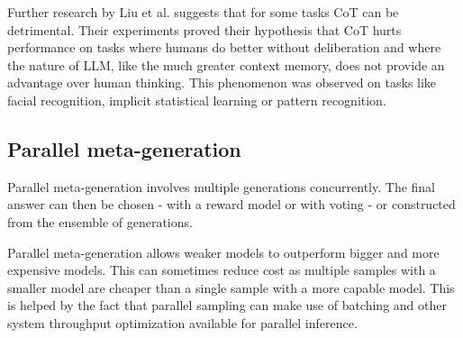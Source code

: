 Further research by Liu et al.\cite{liu2024mindstepbystep} suggests that for some tasks CoT can be detrimental.
Their experiments proved their hypothesis that CoT hurts performance on tasks where humans do better without deliberation
and where the nature of LLM, like the much greater context memory, does not provide an advantage over human thinking. 
This phenomenon was observed on tasks like facial recognition, implicit statistical learning or pattern recognition.

\subsection{Parallel meta-generation}

Parallel meta-generation involves multiple generations concurrently. 
The final answer can then be chosen - with a reward model or with 
voting - or constructed from the ensemble of generations\cite{welleck2024decodingmetagenerationinferencetimealgorithms}.

Parallel meta-generation allows weaker models to outperform bigger and more expensive models\cite{brown2024largelanguagemonkeysscaling}.
This can sometimes reduce cost as multiple samples with a smaller model are cheaper than a single sample with a more capable model.
This is helped by the fact that parallel sampling can make use of batching and other system throughput optimization
available for parallel inference\cite{brown2024largelanguagemonkeysscaling}.

